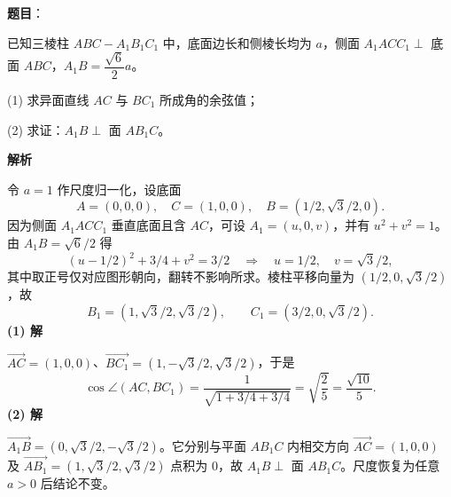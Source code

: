 \begin{answer}

\textbf{题目}：

已知三棱柱 $ABC-A_1B_1C_1$ 中，底面边长和侧棱长均为 $a$，侧面 $A_1ACC_1\perp$ 底面 $ABC$，$A_1B=\dfrac{\sqrt{6}}{2}a$。

(1) 求异面直线 $AC$ 与 $BC_1$ 所成角的余弦值；

(2) 求证：$A_1B\perp$ 面 $AB_1C$。
\nopagebreak[4]
\begin{center}\end{center}
\nopagebreak[4]
\textbf{解析}

令 $a=1$ 作尺度归一化，设底面
\nopagebreak[4]
\[
A=(0,0,0),\quad C=(1,0,0),\quad B=(1/2,\sqrt3/2,0).
\]
因为侧面 $A_1ACC_1$ 垂直底面且含 $AC$，可设 $A_1=(u,0,v)$，并有 $u^2+v^2=1$。由 $A_1B=\sqrt6/2$ 得
\nopagebreak[4]
\[
(u-1/2)^2+3/4+v^2=3/2
\quad\Longrightarrow\quad u=1/2,\quad v=\sqrt3/2,
\]
其中取正号仅对应图形朝向，翻转不影响所求。棱柱平移向量为 $(1/2,0,\sqrt3/2)$，故
\nopagebreak[4]
\[
B_1=(1,\sqrt3/2,\sqrt3/2),\qquad C_1=(3/2,0,\sqrt3/2).
\]
\textbf{(1) 解}

$\overrightarrow{AC}=(1,0,0)$、$\overrightarrow{BC_1}=(1,-\sqrt3/2,\sqrt3/2)$，于是
\nopagebreak[4]
\[
\cos\angle(AC,BC_1)=\frac{1}{\sqrt{1+3/4+3/4}}
=\sqrt{\frac25}=\frac{\sqrt{10}}5.
\]
\textbf{(2) 解}

$\overrightarrow{A_1B}=(0,\sqrt3/2,-\sqrt3/2)$。它分别与平面 $AB_1C$ 内相交方向 $\overrightarrow{AC}=(1,0,0)$ 及 $\overrightarrow{AB_1}=(1,\sqrt3/2,\sqrt3/2)$ 点积为 $0$，故 $A_1B\perp$ 面 $AB_1C$。尺度恢复为任意 $a>0$ 后结论不变。



\end{answer}
